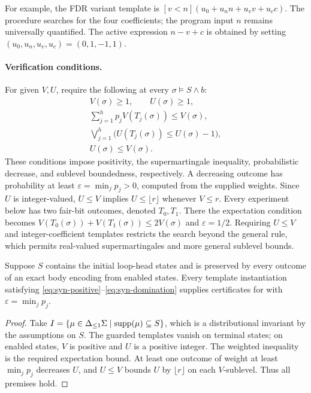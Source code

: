 For example, the FDR variant template is
$[v<n](u_0+u_n n+u_v v+u_c c)$. The procedure searches for the
four coefficients; the program input $n$ remains universally quantified.
The active expression $n-v+c$ is obtained by setting
$(u_0,u_n,u_v,u_c)=(0,1,-1,1)$.

\paragraph{Verification conditions.}
For given $V,U$, require the following at every
$\sigma\models S\land b$:
\begin{gather}
 V(\sigma)\geq1,\qquad U(\sigma)\geq1,
 \label{eq:syn-positive}\\
 \sum_{j=1}^{h}p_j V(T_j(\sigma))\leq V(\sigma),
 \label{eq:syn-supermartingale}\\
 \bigvee_{j=1}^{h}\bigl(U(T_j(\sigma))\leq U(\sigma)-1\bigr),
 \label{eq:syn-progress}\\
 U(\sigma)\leq V(\sigma).
 \label{eq:syn-domination}
\end{gather}
These conditions impose positivity, the supermartingale inequality,
probabilistic decrease, and sublevel boundedness, respectively.
A decreasing outcome has probability at least $\varepsilon=\min_jp_j>0$,
computed from the supplied weights. Since $U$ is integer-valued,
$U\leq V$ implies $U\leq\lfloor r\rfloor$ whenever $V\leq r$.
Every experiment below has two fair-bit outcomes, denoted $T_0,T_1$.
There the expectation condition becomes
$V(T_0(\sigma))+V(T_1(\sigma))\leq2V(\sigma)$ and
$\varepsilon=1/2$.
Requiring $U\leq V$ and integer-coefficient templates restricts the
search beyond the general rule, which permits real-valued
supermartingales and more general sublevel bounds.

\begin{proposition}
\label{prop:synthesis-soundness}
Suppose $S$ contains the initial loop-head states and is preserved by
every outcome of an exact body encoding from enabled states.
Every template instantiation
satisfying \eqref{eq:syn-positive}--\eqref{eq:syn-domination} supplies
certificates for  with
$\varepsilon=\min_jp_j$.
\end{proposition}
\begin{proof}
Take $I=\{\mu\in{\Delta_{\leq 1}\Sigma}\mid\textnormal{supp}(\mu)\subseteq S\}$, which is
a distributional invariant by the assumptions on $S$.
The guarded templates vanish on terminal states; on enabled states,
$V$ is positive and $U$ is a positive integer. The weighted inequality
is the required expectation bound. At least one outcome of weight
at least $\min_jp_j$ decreases $U$, and $U\leq V$ bounds $U$ by
$\lfloor r\rfloor$ on each $V$-sublevel. Thus all premises hold.
\end{proof}

